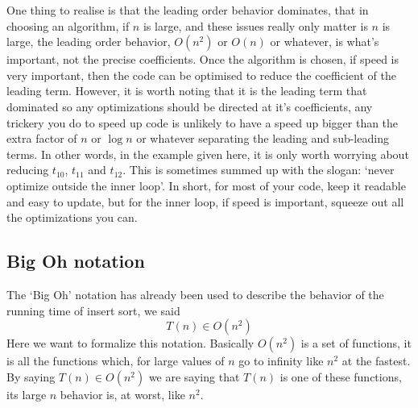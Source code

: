 \documentclass[11pt,a4paper]{scrartcl}
\begin{document}
One thing to realise is that the leading order behavior dominates,
that in choosing an algorithm, if $n$ is large, and these issues
really only matter is $n$ is large, the leading order behavior,
$O(n^2)$ or $O(n)$ or whatever, is what's important, not the precise
coefficients. Once the algorithm is chosen, if speed is very
important, then the code can be optimised to reduce the coefficient of
the leading term. However, it is worth noting that it is the leading
term that dominated so any optimizations should be directed at it's
coefficients, any trickery you do to speed up code is unlikely to have
a speed up bigger than the extra factor of $n$ or $\log{n}$ or
whatever separating the leading and sub-leading terms. In other words,
in the example given here, it is only worth worrying about reducing
$t_{10}$, $t_{11}$ and $t_{12}$. This is sometimes summed up with the
slogan: \lq{}never optimize outside the inner loop\rq{}. In short, for
most of your code, keep it readable and easy to update, but for the
inner loop, if speed is important, squeeze out all the optimizations
you can.


\subsection*{Big Oh notation}

The \lq{}Big Oh\rq{} notation has already been used to describe the
behavior of the running time of insert sort, we said
\begin{equation}
T(n)\in O(n^2)
\end{equation}
Here we want to formalize this notation. Basically $O(n^2)$ is a set
of functions, it is all the functions which, for large values of $n$ go
to infinity like $n^2$ at the fastest. By saying $T(n)\in O(n^2)$ we
are saying that $T(n)$ is one of these functions, its large $n$
behavior is, at worst, like $n^2$. 
\end{document}

